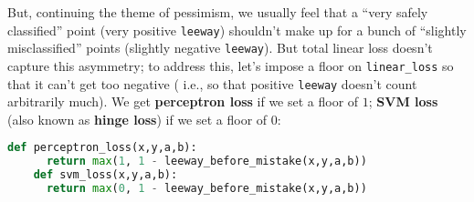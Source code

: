   But, continuing the theme of pessimism, we usually feel that a ``very safely
  classified'' point (very positive \texttt{leeway}) shouldn't make up for a
  bunch of ``slightly misclassified'' points (slightly negative
  \texttt{leeway}).
  But total linear loss
  doesn't capture this asymmetry;
  to address this, let's impose a floor on
  \texttt{linear\_loss} so that it can't get too negative
  (%
  i.e., so that
    positive \texttt{leeway} doesn't count arbitrarily much).
  We get \textbf{perceptron loss} if we set a floor of $1$; \textbf{SVM loss}
  (also known as \textbf{hinge loss}) if we set a floor of $0$:
  \begin{lstlisting}[language=Python, basicstyle=\footnotesize\ttfamily]
    def perceptron_loss(x,y,a,b):
      return max(1, 1 - leeway_before_mistake(x,y,a,b))
    def svm_loss(x,y,a,b):
      return max(0, 1 - leeway_before_mistake(x,y,a,b))
  \end{lstlisting}

